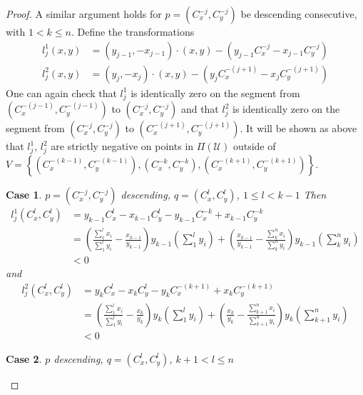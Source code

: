 \documentclass{article}
\theoremstyle{case}
\newtheorem{case}{Case}
\begin{document}
\begin{proof}
\noindent A similar argument holds for $p = \left( C_x^{-j}, C_y^{-j}\right)$ be descending consecutive, with $1 < k \leq n$. Define the transformations
\begin{align*}
l_j^1\left( x,y\right) &= \left( y_{j-1}, -x_{j-1}\right) \cdot \left( x,y\right) - \left( y_{j-1}C_x^{-j} - x_{j-1}C_y^{-j}\right) \\
l_j^2\left( x,y\right) &= \left( y_j, -x_j\right) \cdot \left( x,y\right) - \left( y_jC_x^{-\left(j+1\right)} - x_jC_y^{-\left( j+1\right)}\right)
\end{align*}
One can again check that $l_j^1$ is identically zero on the segment from $\left( C_x^{-(j-1)}, C_y^{-(j-1)}\right)$ to $\left( C_x^{-j}, C_y^{-j}\right)$ and that $l_j^2$ is identically zero on the segment from  $\left( C_x^{-j}, C_y^{-j}\right)$ to $\left( C_x^{-(j+1)}, C_y^{-(j+1)}\right)$. It will be shown as above that $l_j^1$, $l_j^2$ are strictly negative on points in $\Pi(\mathcal{U})$ outside of $V = \left\lbrace (C_x^{-(k-1)}, C_y^{-(k-1)}), (C_x^{-k}, C_y^{-k}), (C_x^{-(k+1)}, C_y^{-(k+1)})\right\rbrace$. 

%
%
\setcounter{case}{0}
\begin{case} $p = \left( C_x^{-j}, C_y^{-j}\right)$ descending, $q = \left( C_x^l, C_y^l\right)$, $1 \leq l < k-1$
\noindent Then
\begin{align*}
l_j^1\left( C_x^l, C_y^l \right) &= y_{k-1}C_x^l - x_{k-1}C_y^l - y_{k-1}C_x^{-k} + x_{k-1}C_y^{-k} \\
&= \left( \frac{\sum_1^l x_i}{\sum_1^l y_i} - \frac{x_{k-1}}{y_{k-1}}\right)y_{k-1}\left( \sum_1^l y_i\right) + \left( \frac{x_{k-1}}{y_{k-1}} - \frac{\sum_k^n x_i}{\sum_k^n y_i}\right)y_{k-1}\left( \sum_k^n y_i\right) \\
&< 0
\end{align*}
and
\begin{align*}
l_j^2\left( C_x^l, C_y^l\right) &= y_kC_x^l - x_kC_y^l - y_kC_x^{-(k+1)} + x_kC_y^{-(k+1)} \\
&= \left( \frac{\sum_1^l x_i}{\sum_1^l y_i} - \frac{x_k}{y_k}\right)y_k\left( \sum_1^l y_i \right) + \left( \frac{x_k}{y_k} - \frac{\sum_{k+1}^n x_i}{\sum_{k+1}^n y_i}\right)y_k\left( \sum_{k+1}^n y_i\right) \\
&< 0
\end{align*}
\end{case}

%
%
\begin{case} $p$ descending, $q = \left( C_x^l, C_y^l\right)$, $k+1 < l \leq n$


\end{case}
\end{proof}
\end{document}
